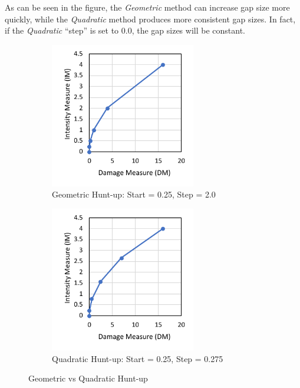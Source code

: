 \documentclass{article}
\renewcommand{\^}[1]{\textsuperscript{#1}}
\renewcommand{\_}[1]{\textsubscript{#1}}
\begin{document}
As can be seen in the figure, the \textit{Geometric} method can increase gap size more quickly, while the \textit{Quadratic} method produces more consistent gap sizes. In fact, if the \textit{Quadratic} ``step'' is set to 0.0, the gap sizes will be constant.
\begin{figure}[!htb]
\centering
\begin{subfigure}[b]{0.45\linewidth}
    \centering
    \includegraphics[width=2.5in]{ida_geometric_huntup}
    \caption{Geometric Hunt-up: \newline Start = 0.25, Step = 2.0}
    \label{fig:ida_geometric_huntup}
\end{subfigure}
\begin{subfigure}[b]{0.45\linewidth}
    \centering
    \includegraphics[width=2.5in]{ida_quadratic_huntup}
    \caption{Quadratic Hunt-up: \newline Start = 0.25, Step = 0.275}
    \label{fig:ida_quadratic_huntup}
\end{subfigure}
\caption{Geometric vs Quadratic Hunt-up}
\label{fig:ida_huntup}
\end{figure}
\clearpage
\end{document}
